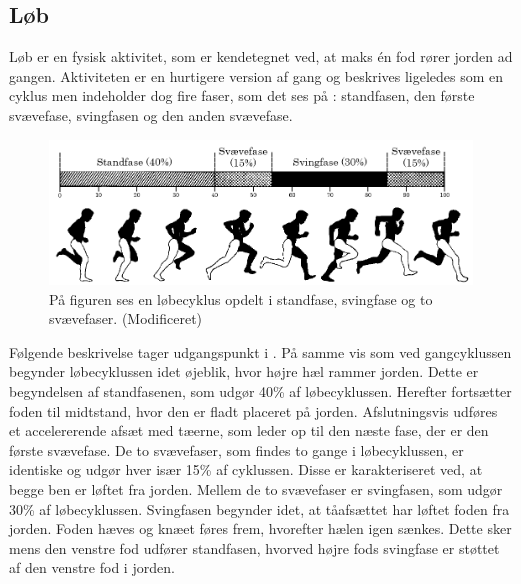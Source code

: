 \subsection{Løb}
Løb er en fysisk aktivitet, som er kendetegnet ved, at maks én fod rører jorden ad gangen. Aktiviteten er en hurtigere version af gang og beskrives ligeledes som en cyklus men indeholder dog fire faser, som det ses på : standfasen, den første svævefase, svingfasen og den anden svævefase. \citep{Adelaar1986,Novacheck1998}
\begin{figure}[H]
	\centering
	\includegraphics[scale=0.4]{figures/bProblemloesning/loeb_cyklus1.png}
	\caption{På figuren ses en løbecyklus opdelt i standfase, svingfase og to svævefaser. \citep{Adelaar1986} (Modificeret)}
	\label{fig:loebecyklus}
\end{figure}
Følgende beskrivelse tager udgangspunkt i . På samme vis som ved gangcyklussen begynder løbecyklussen idet øjeblik, hvor højre hæl rammer jorden. Dette er begyndelsen af standfasenen, som udgør 40\% af løbecyklussen. Herefter fortsætter foden til midtstand, hvor den er fladt placeret på jorden. Afslutningsvis udføres et accelererende afsæt med tæerne, som leder op til den næste fase, der er den første svævefase. \citep{Adelaar1986,Novacheck1998} \newline
De to svævefaser, som findes to gange i løbecyklussen, er identiske og udgør hver især 15\% af cyklussen. Disse er karakteriseret ved, at begge ben er løftet fra jorden. \citep{Adelaar1986,Novacheck1998} Mellem de to svævefaser er svingfasen, som udgør 30\% af løbecyklussen. Svingfasen begynder idet, at tåafsættet har løftet foden fra jorden. Foden hæves og knæet føres frem, hvorefter hælen igen sænkes. Dette sker mens den venstre fod udfører standfasen, hvorved højre fods svingfase er støttet af den venstre fod i jorden. \citep{Adelaar1986,Novacheck1998} %

